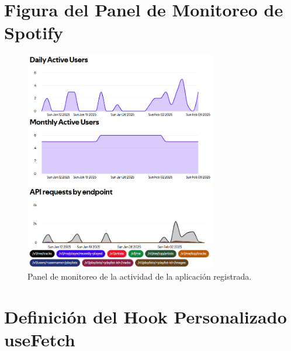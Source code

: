 \section*{Figura del Panel de Monitoreo de Spotify}

\begin{figure}[H]
    \centering
    \includegraphics[width=0.75\textwidth]{figures/registro_spotify/dashboard_spotify.png}
    \caption{Panel de monitoreo de la actividad de la aplicación registrada.}
    \label{fig:dashboard_spotify}
\end{figure}

\section*{Definición del Hook Personalizado useFetch}

